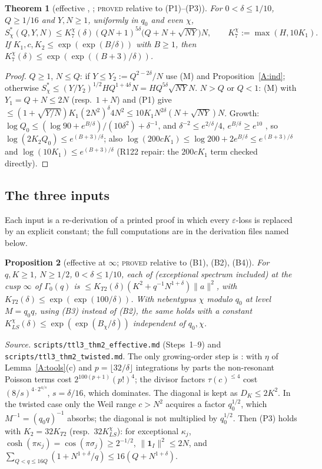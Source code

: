 \documentclass[10pt,reqno]{amsart}
\newtheorem{theorem}{Theorem}[section]
\newtheorem{proposition}[theorem]{Proposition}
\theoremstyle{definition}
\numberwithin{equation}{section}
\newcommand{\ind}{\mathbf 1}
\newcommand{\status}[1]{\textup{\textsc{#1}}}
\begin{document}
\begin{theorem}[effective {\cite[Theorem~7]{DI}}, {\cite[Lemma~4.10]{Dr}}; \status{proved} relative to (P1)--(P3)]\label{A:neb}
For $0<\delta\le1/10$, $Q\ge1/16$ and $Y,N\ge1$, uniformly in $q_0$ and even $\chi$,
\[
 S_\chi^*(Q,Y,N)\le K_7^\chi(\delta)(QN+1)^{5\delta}\bigl(Q+N+\sqrt{NY}\bigr)N,
 \qquad K_7^\chi:=\max(H,10K_1).
\]
If $K_1,c,K_2\le\exp(\exp(B/\delta))$ with $B\ge1$, then $K_7^\chi(\delta)\le\exp(\exp((B+3)/\delta))$.
\end{theorem}
\begin{proof}
$Q\ge1$, $N\le Q$: if $Y\le Y_2:=Q^{2-2\delta}/N$ use (M) and
Proposition~\ref{A:ind}; otherwise $S^*_\chi\le(Y/Y_2)^{1/2}HQ^{1+4\delta}N=HQ^{5\delta}\sqrt{NY}N$.
$N>Q$ or $Q<1$: (M) with $Y_1=Q+N\le2N$ (resp.\ $1+N$) and (P1) give
$\le(1+\sqrt{Y/N})K_1(2N^2)^\delta4N^2\le10K_1N^{2\delta}(N+\sqrt{NY})N$.
Growth: $\log Q_0\le(\log90+e^{B/\delta})/(10\delta^2)+\delta^{-1}$, and
$\delta^{-2}\le e^{2/\delta}/4$, $e^{B/\delta}\ge e^{10}$ \cite[Corollary~2.3]{TTL3}, so
$\log(2K_2Q_0)\le e^{(B+3)/\delta}$; also $\log(200cK_1)\le\log200+2e^{B/\delta}\le e^{(B+3)/\delta}$ and
$\log(10K_1)\le e^{(B+3)/\delta}$ (R122 repair: the $200cK_1$ term checked directly).
\end{proof}

\subsection{The three inputs}
Each input is a re-derivation of a printed proof in which every
$\varepsilon$-loss is replaced by an explicit constant; the full
computations are in the derivation files named below.

\begin{proposition}[effective {\cite[Theorem~2]{DI}} at $\infty$; \status{proved} relative to (B1), (B2), (B4)]\label{A:T2}
For $q,K\ge1$, $N\ge1/2$, $0<\delta\le1/10$, each of \cite[(1.28)--(1.30)]{DI}
\textup(exceptional spectrum included\textup) at the cusp $\infty$ of
$\Gamma_0(q)$ is $\le K_{T2}(\delta)(K^2+q^{-1}N^{1+\delta})\|a\|^2$, with
$K_{T2}(\delta)\le\exp(\exp(100/\delta))$. With nebentypus $\chi$ modulo $q_0$
at level $M=q_0q$, using (B3) instead of (B2), the same holds with a constant
$K_{LS}^\chi(\delta)\le\exp(\exp(B_\chi/\delta))$ independent of $q_0,\chi$.
\end{proposition}
\emph{Source.} \nolinkurl{scripts/ttl3_thm2_effective.md} (Steps~1--9) and
\nolinkurl{scripts/ttl3_thm2_twisted.md}. The only growing-order step is
\cite[Proposition~3, (1.27), p.~257]{DI}: with $\eta$ of
Lemma~\ref{A:tools}(c) and $p=\lfloor32/\delta\rfloor$ integrations by parts the
non-resonant Poisson terms cost $2^{100(p+1)}(p!)^4$; the divisor factors
$\tau(c)^{\le4}$ cost $(8/s)^{4\cdot2^{4/s}}$, $s=\delta/16$, which dominates.
The diagonal is kept as $D_K\le2K^2$. In the twisted case only the Weil range
$c>N^2$ acquires a factor $q_0^{1/2}$, which $M^{-1}=(q_0q)^{-1}$ absorbs; the
diagonal is not multiplied by $q_0^{1/2}$. Then (P3) holds with $K_2=32K_{T2}$
(resp.\ $32K_{LS}^\chi$): for exceptional $\kappa_j$, $\cosh(\pi\kappa_j)=\cos(\pi\sigma_j)\ge2^{-1/2}$,
$\|\ind_I\|^2\le2N$, and $\sum_{Q<q\le16Q}(1+N^{1+\delta}/q)\le16(Q+N^{1+\delta})$.
\end{document}
